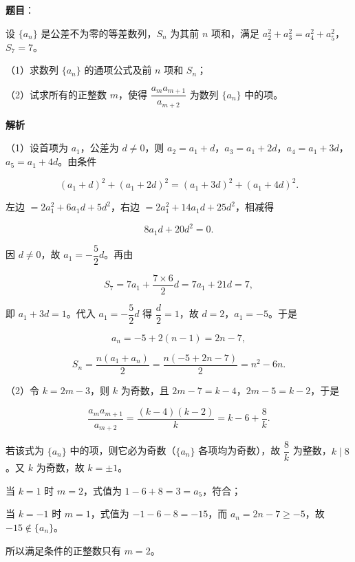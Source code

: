 \begin{answer}

\textbf{题目}：

设 $\{a_n\}$ 是公差不为零的等差数列，$S_n$ 为其前 $n$ 项和，满足 $a_2^2+a_3^2=a_4^2+a_5^2$，$S_7=7$。

（1）求数列 $\{a_n\}$ 的通项公式及前 $n$ 项和 $S_n$；

（2）试求所有的正整数 $m$，使得 $\dfrac{a_ma_{m+1}}{a_{m+2}}$ 为数列 $\{a_n\}$ 中的项。

\textbf{解析}

（1）设首项为 $a_1$，公差为 $d\neq0$，则 $a_2=a_1+d$，$a_3=a_1+2d$，$a_4=a_1+3d$，$a_5=a_1+4d$。由条件

\nopagebreak[4]
\[(a_1+d)^2+(a_1+2d)^2=(a_1+3d)^2+(a_1+4d)^2 .\]

左边 $=2a_1^2+6a_1d+5d^2$，右边 $=2a_1^2+14a_1d+25d^2$，相减得

\nopagebreak[4]
\[8a_1d+20d^2=0 .\]

因 $d\neq0$，故 $a_1=-\dfrac52d$。再由

\nopagebreak[4]
\[S_7=7a_1+\frac{7\times6}2d=7a_1+21d=7,\]

即 $a_1+3d=1$。代入 $a_1=-\dfrac52d$ 得 $\dfrac d2=1$，故 $d=2$，$a_1=-5$。于是

\nopagebreak[4]
\[a_n=-5+2(n-1)=2n-7,\]

\nopagebreak[4]
\[S_n=\frac{n(a_1+a_n)}2=\frac{n(-5+2n-7)}2=n^2-6n .\]

（2）令 $k=2m-3$，则 $k$ 为奇数，且 $2m-7=k-4$，$2m-5=k-2$，于是

\nopagebreak[4]
\[\frac{a_ma_{m+1}}{a_{m+2}}=\frac{(k-4)(k-2)}k=k-6+\frac8k .\]

若该式为 $\{a_n\}$ 中的项，则它必为奇数（$\{a_n\}$ 各项均为奇数），故 $\dfrac8k$ 为整数，$k\mid8$。又 $k$ 为奇数，故 $k=\pm1$。

当 $k=1$ 时 $m=2$，式值为 $1-6+8=3=a_5$，符合；

当 $k=-1$ 时 $m=1$，式值为 $-1-6-8=-15$，而 $a_n=2n-7\geqslant-5$，故 $-15\notin\{a_n\}$。

所以满足条件的正整数只有 $m=2$。


\end{answer}
